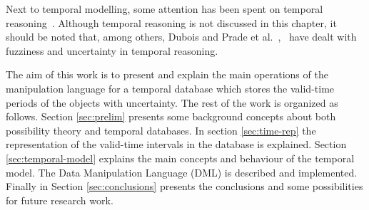 Next to temporal modelling, some attention has been spent on temporal reasoning~\cite{Allen1983}. Although temporal reasoning is not discussed in this chapter, it should be noted that, among others, Dubois and Prade et al.~\cite{Dubois2003},~\cite{DuBois1989} have dealt with fuzziness and uncertainty in temporal reasoning.

The aim of this work is to present and explain the main operations of the manipulation language for a temporal database which stores the valid-time periods of the objects with uncertainty. The rest of the work is organized as follows. Section \ref{sec:prelim} presents some background concepts about both possibility theory and temporal databases. In section \ref{sec:time-rep} the representation of the valid-time intervals in the database is explained. Section \ref{sec:temporal-model} explains the main concepts and behaviour of the temporal model. The Data Manipulation Language (DML) is described and implemented. Finally in Section \ref{sec:conclusions} presents the conclusions and some possibilities for future research work.

